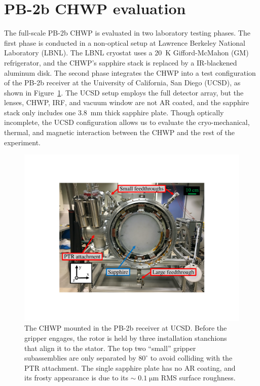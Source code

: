 
\section{PB-2b CHWP evaluation}
\label{sec:pb2b_chwp_evaluation}

The full-scale PB-2b CHWP is evaluated in two laboratory testing phases. The first phase is conducted in a non-optical setup at Lawrence Berkeley National Laboratory (LBNL). The LBNL cryostat uses a 20~K Gifford-McMahon (GM) refrigerator, and the CHWP's sapphire stack is replaced by a IR-blackened aluminum disk. The second phase integrates the CHWP into a test configuration of the PB-2b receiver at the University of California, San Diego (UCSD), as shown in Figure~\ref{fig:chwp_in_pb2b}. The UCSD setup employs the full detector array, but the lenses, CHWP, IRF, and vacuum window are not AR coated, and the sapphire stack only includes one 3.8~mm thick sapphire plate. Though optically incomplete, the UCSD configuration allows us to evaluate the cryo-mechanical, thermal, and magnetic interaction between the CHWP and the rest of the experiment.

\begin{figure}[!t]
    \centering
    \includegraphics[width=0.7\linewidth, trim=4.4cm 4.5cm 4.5cm 3.5cm, clip]{CHWPEvaluation/Figures/CHWP_in_PB2b_photo.pdf}
    \caption{The CHWP mounted in the PB-2b receiver at UCSD. Before the gripper engages, the rotor is held by three installation stanchions that align it to the stator. The top two ``small'' gripper subassemblies are only separated by $80^{\circ}$ to avoid colliding with the PTR attachment. The single sapphire plate has no AR coating, and its frosty appearance is due to its $\sim \; 0.1 \; \mathrm{\mu m}$ RMS surface roughness.}
    \label{fig:chwp_in_pb2b}
\end{figure}

